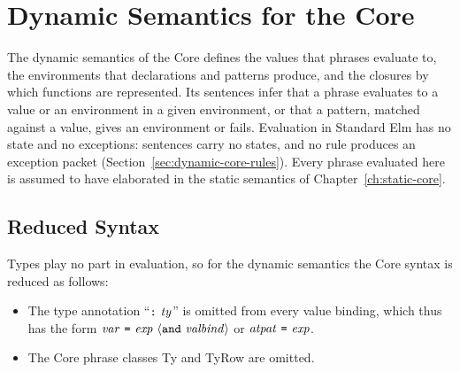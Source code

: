 \chapter{Dynamic Semantics for the Core}\label{ch:dynamic-core}

The dynamic semantics of the Core defines the values that phrases evaluate
to, the environments that declarations and patterns produce, and the closures
by which functions are represented. Its sentences infer that a phrase
evaluates to a value or an environment in a given environment, or that a
pattern, matched against a value, gives an environment or fails. Evaluation
in Standard Elm has no state and no exceptions: sentences carry no states,
and no rule produces an exception packet (Section~\ref{sec:dynamic-core-rules}).
Every phrase evaluated here is assumed to have elaborated in the static
semantics of Chapter~\ref{ch:static-core}. %

\section{Reduced Syntax}\label{sec:dynamic-core-reduced}

Types play no part in evaluation, so for the dynamic semantics the Core
syntax is reduced as follows:
\begin{itemize}
\item The type annotation ``$\kw{:}\ \ty$'' is omitted from every value
  binding, which thus has the form
  $\var\ \kw{=}\ \expm\ \opt{\kw{and}\ \valbind}$ or
  $\atpat\ \kw{=}\ \expm$.
\item The Core phrase classes Ty and TyRow are omitted.
\end{itemize}

